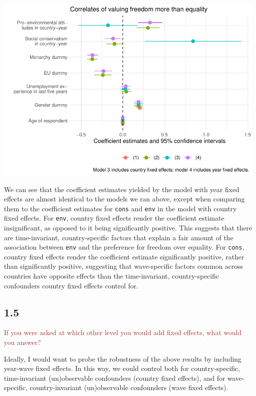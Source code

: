 \documentclass[
]{article}
\begin{document}
\includegraphics{AVCD-Assignment3-Edenhofer_files/figure-latex/year-fe-free-better-1.pdf}

We can see that the coefficient estimates yielded by the model with year
fixed effects are almost identical to the models we ran above, except
when comparing them to the coefficient estimates for \texttt{cons} and
\texttt{env} in the model with country fixed effects. For \texttt{env},
country fixed effects render the coefficient estimate insignificant, as
opposed to it being significantly positive. This suggests that there are
time-invariant, country-specific factors that explain a fair amount of
the association between \texttt{env} and the preference for freedom over
equality. For \texttt{cons}, country fixed effects render the
coefficient estimate significantly positive, rather than significantly
positive, suggesting that wave-specific factors common across countries
have opposite effects than the time-invariant, country-specific
confounders country fixed effects control for.

\hypertarget{section-4}{%
\subsection{1.5}\label{section-4}}

\textcolor{brown}{If you were asked at which other level you would add fixed effects, what would you answer?}

Ideally, I would want to probe the robustness of the above results by
including year-wave fixed effects. In this way, we could control both
for country-specific, time-invariant (un)observable confounders (country
fixed effects), and for wave-specific, country-invariant (un)observable
confounders (wave fixed effects).
\end{document}
